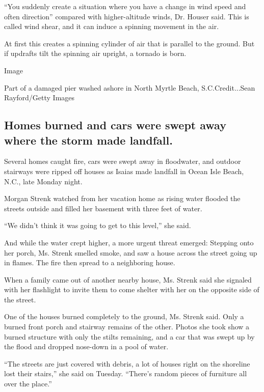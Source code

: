 ``You suddenly create a situation where you have a change in wind speed
and often direction'' compared with higher-altitude winds, Dr. Houser
said. This is called wind shear, and it can induce a spinning movement
in the air.

At first this creates a spinning cylinder of air that is parallel to the
ground. But if updrafts tilt the spinning air upright, a tornado is
born.

Image

Part of a damaged pier washed ashore in North Myrtle Beach,
S.C.Credit...Sean Rayford/Getty Images

\hypertarget{homes-burned-and-cars-were-swept-away-where-the-storm-made-landfall}{%
\subsection{Homes burned and cars were swept away where the storm made
landfall.}\label{homes-burned-and-cars-were-swept-away-where-the-storm-made-landfall}}

Several homes caught fire, cars were swept away in floodwater, and
outdoor stairways were ripped off houses as Isaias made landfall in
Ocean Isle Beach, N.C., late Monday night.

Morgan Strenk watched from her vacation home as rising water flooded the
streets outside and filled her basement with three feet of water.

``We didn't think it was going to get to this level,'' she said.

And while the water crept higher, a more urgent threat emerged: Stepping
onto her porch, Ms. Strenk smelled smoke, and saw a house across the
street going up in flames. The fire then spread to a neighboring house.

When a family came out of another nearby house, Ms. Strenk said she
signaled with her flashlight to invite them to come shelter with her on
the opposite side of the street.

One of the houses burned completely to the ground, Ms. Strenk said. Only
a burned front porch and stairway remains of the other. Photos she took
show a burned structure with only the stilts remaining, and a car that
was swept up by the flood and dropped nose-down in a pool of water.

``The streets are just covered with debris, a lot of houses right on the
shoreline lost their stairs,'' she said on Tuesday. ``There's random
pieces of furniture all over the place.''

